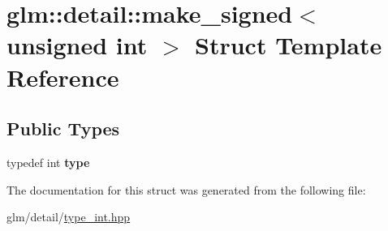 \hypertarget{structglm_1_1detail_1_1make__signed_3_01unsigned_01int_01_4}{\section{glm\-:\-:detail\-:\-:make\-\_\-signed$<$ unsigned int $>$ Struct Template Reference}
\label{structglm_1_1detail_1_1make__signed_3_01unsigned_01int_01_4}
}
\subsection*{Public Types}
\begin{DoxyCompactItemize}
\item 
\hypertarget{structglm_1_1detail_1_1make__signed_3_01unsigned_01int_01_4_a78b4ada342bba40027f755d20eae141a}{typedef int {\bfseries type}}\label{structglm_1_1detail_1_1make__signed_3_01unsigned_01int_01_4_a78b4ada342bba40027f755d20eae141a}

\end{DoxyCompactItemize}


The documentation for this struct was generated from the following file\-:\begin{DoxyCompactItemize}
\item 
glm/detail/\hyperlink{type__int_8hpp}{type\-\_\-int.\-hpp}\end{DoxyCompactItemize}
